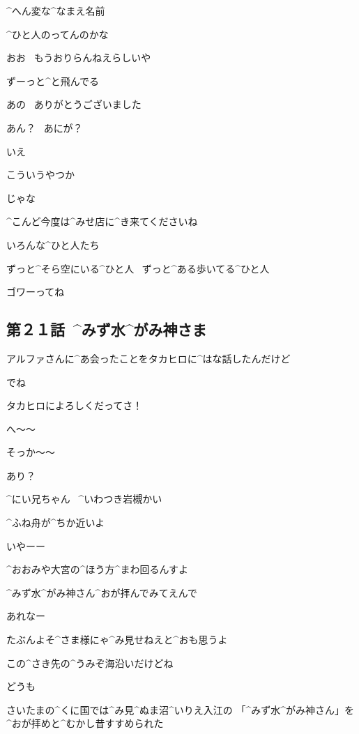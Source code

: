 \Alpha ^{へん}{変}な^{なまえ}{名前}

\Alpha ^{ひと}{人}のってんのかな

\Ayase おお
\ もうおりらんねえらしいや

\Ayase ずーっと^{と}{飛}んでる

\page[80]
\Alpha あの
\ ありがとうございました

\Ayase あん？
\ あにが？

\Alpha いえ

\Ayase こういうやつか

\page
\Ayase じゃな

\Alpha ^{こんど}{今度}は^{みせ}{店}に^{き}{来}てくださいね

\page
\Alpha いろんな^{ひと}{人}たち

\Alpha ずっと^{そら}{空}にいる^{ひと}{人}
\ ずっと^{ある}{歩}いてる^{ひと}{人}

\Alpha ゴワーってね


\subsection{第２１話\ ^{みず}{水}^{がみ}{神}さま}

\page[84]
\Narrator アルファさんに^{あ}{会}ったことをタカヒロに^{はな}{話}したんだけど

\page
\Alpha でね

\Alpha タカヒロによろしくだってさ！

\Takahiro へ〜〜

\Takahiro そっか〜〜

\Alpha あり？

\page
\Person ^{にい}{兄}ちゃん
\ ^{いわつき}{岩槻}かい

\Person ^{ふね}{舟}が^{ちか}{近}いよ

\Ayase いやーー

\Ayase ^{おおみや}{大宮}の^{ほう}{方}^{まわ}{回}るんすよ

\Ayase ^{みず}{水}^{がみ}{神}さん^{おが}{拝}んでみてえんで

\page
\Person あれなー

\Person たぶんよそ^{さま}{様}にゃ^{み}{見}せねえと^{おも}{思}うよ

\Person この^{さき}{先}の^{うみぞ}{海沿}いだけどね

\Ayase どうも

\Ayase さいたまの^{くに}{国}では^{み}{見}^{ぬま}{沼}^{いりえ}{入江}の
 「^{みず}{水}^{がみ}{神}さん」を^{おが}{拝}めと^{むかし}{昔}すすめられた

